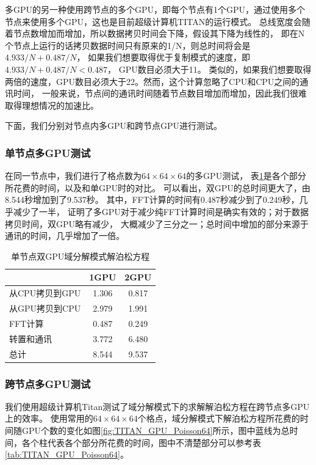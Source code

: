 多GPU的另一种使用跨节点的多个GPU，即每个节点有1个GPU，通过使用多个节点来使用多个GPU，这也是目前超级计算机TITAN的运行模式。
总线宽度会随着节点数增加而增加，所以数据拷贝时间会下降，假设其下降为线性的，
即在N个节点上运行的话拷贝数据时间只有原来的1/N，则总时间将会是 $4.933/N+0.487/N$，
如果我们想要取得优于复制模式的速度，即 $4.933/N+0.487/N<0.487$， GPU数目必须大于11。
类似的，如果我们想要取得两倍的速度，GPU数目必须大于22。然而，这个计算忽略了CPU和CPU之间的通讯时间，
一般来说，节点间的通讯时间随着节点数目增加而增加，因此我们很难取得理想情况的加速比。

下面，我们分别对节点内多GPU和跨节点GPU进行测试。

\subsubsection{单节点多GPU测试}
在同一节点中，我们进行了格点数为$64 \times 64 \times 64$的多GPU测试，
表\ref{tab:2GPU_Poisson}是各个部分所花费的时间，以及和单GPU时的对比。
可以看出，双GPU的总时间更大了，由8.544秒增加到了9.537秒。
其中，FFT计算的时间有0.487秒减少到了0.249秒，几乎减少了一半，
证明了多GPU对于减少纯FFT计算时间是确实有效的；对于数据拷贝时间，双GPU略有减少，
大概减少了三分之一；总时间中增加的部分来源于通讯的时间，几乎增加了一倍。
\begin{table}[!htbp]
    \centering
    \footnotesize%
    \setlength{\tabcolsep}{4pt}%
    \renewcommand{\arraystretch}{1.2}%
    \begin{tabular}{lcc}
        \hline\hline
                          & 1GPU    & 2GPU   \\
        \hline\hline
        从CPU拷贝到GPU    & 1.306   & 0.817  \\
        \hline
        从GPU拷贝到CPU    & 2.979   & 1.991  \\
        \hline
        FFT计算           & 0.487   & 0.249  \\
        \hline
        转置和通讯        & 3.772   & 6.480  \\
        \hline
        总计              & 8.544   & 9.537  \\
        \hline\hline
    \end{tabular}
    \caption{单节点双GPU域分解模式解泊松方程}
    \label{tab:2GPU_Poisson}
\end{table}

\subsubsection{跨节点多GPU测试}
我们使用超级计算机Titan测试了域分解模式下的求解解泊松方程在跨节点多GPU上的效率。
使用常用的$64 \times 64 \times 64$个格点，域分解模式下解泊松方程所花费的时间随GPU个数的变化如图\ref{fig:TITAN_GPU_Poisson64}所示，图中蓝线为总时间，各个柱代表各个部分所花费的时间，图中不清楚部分可以参考表\ref{tab:TITAN_GPU_Poisson64}。

